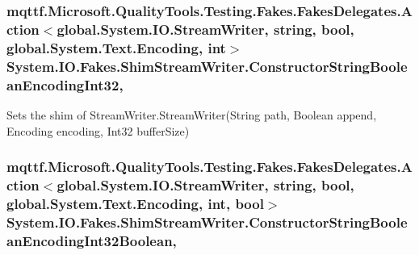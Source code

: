 \hypertarget{class_system_1_1_i_o_1_1_fakes_1_1_shim_stream_writer_a9d4ccb76fed81b8feeb5ff8c869ce124}{
\subsubsection[{Constructor\-String\-Boolean\-Encoding\-Int32}]{\setlength{\rightskip}{0pt plus 5cm}mqttf.\-Microsoft.\-Quality\-Tools.\-Testing.\-Fakes.\-Fakes\-Delegates.\-Action$<$global.\-System.\-I\-O.\-Stream\-Writer, string, bool, global.\-System.\-Text.\-Encoding, int$>$ System.\-I\-O.\-Fakes.\-Shim\-Stream\-Writer.\-Constructor\-String\-Boolean\-Encoding\-Int32\hspace{0.3cm}{\ttfamily [static]}, {\ttfamily [set]}}}\label{class_system_1_1_i_o_1_1_fakes_1_1_shim_stream_writer_a9d4ccb76fed81b8feeb5ff8c869ce124}


Sets the shim of Stream\-Writer.\-Stream\-Writer(\-String path, Boolean append, Encoding encoding, Int32 buffer\-Size)

\hypertarget{class_system_1_1_i_o_1_1_fakes_1_1_shim_stream_writer_ab969956e36855f505e9a102e20a0c051}{
\subsubsection[{Constructor\-String\-Boolean\-Encoding\-Int32\-Boolean}]{\setlength{\rightskip}{0pt plus 5cm}mqttf.\-Microsoft.\-Quality\-Tools.\-Testing.\-Fakes.\-Fakes\-Delegates.\-Action$<$global.\-System.\-I\-O.\-Stream\-Writer, string, bool, global.\-System.\-Text.\-Encoding, int, bool$>$ System.\-I\-O.\-Fakes.\-Shim\-Stream\-Writer.\-Constructor\-String\-Boolean\-Encoding\-Int32\-Boolean\hspace{0.3cm}{\ttfamily [static]}, {\ttfamily [set]}}}\label{class_system_1_1_i_o_1_1_fakes_1_1_shim_stream_writer_ab969956e36855f505e9a102e20a0c051}


